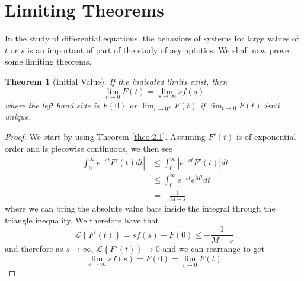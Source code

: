 \documentclass{report}
\newtheorem{theorem}{Theorem}[chapter]
\theoremstyle{definition}
\theoremstyle{remark}
\newcommand{\lapt}[1]{\mathscr{L}\left\{ #1\right\}}
\begin{document}
\section{Limiting Theorems}
In the study of differential equations, the behaviors of systems for large values of $t$ or $s$ is an important of part of the study of asymptotics. We shall now prove some limiting theorems.
\begin{theorem} [Initial Value]
    If the indicated limits exist, then 
    \begin{equation*}
        \lim_{t\rightarrow 0} F(t) = \lim_{s\rightarrow \infty} sf(s)
    \end{equation*}
    where the left hand side is $F(0)$ or $\lim_{t\rightarrow 0^+}F(t)$ if $\lim_{t\rightarrow 0}F(t)$ isn't unique.
\end{theorem}
\begin{proof}
    We start by using Theorem \ref{theo:2.1}. Assuming $F'(t)$ is of exponential order and is piecewise continuous, we then see 
    \begin{equation*}
    \begin{split}
        \left| \int^\infty_0e^{-st}F'(t)dt \right| &\leq \int^\infty_0 |e^{-st}F'(t)|dt \\
        & \leq \int^\infty_0e^{-st}e^{Mt} dt \\
        &=-\frac{1}{M-s}
    \end{split}
    \end{equation*}
    where we can bring the absolute value bars inside the integral through the triangle inequality. We therefore have that 
    \begin{equation*}
        \lapt{F'(t)} = sf(s) -F(0)\leq -\frac{1}{M-s}
    \end{equation*}
    and therefore as $s\rightarrow \infty$, $\lapt{F'(t)} \rightarrow 0$ and we can rearrange to get 
    \begin{equation*}
        \lim_{s\rightarrow \infty }sf(s) = F(0) =\lim_{t\rightarrow 0}F(t)
    \end{equation*}
\end{proof}
\end{document}
